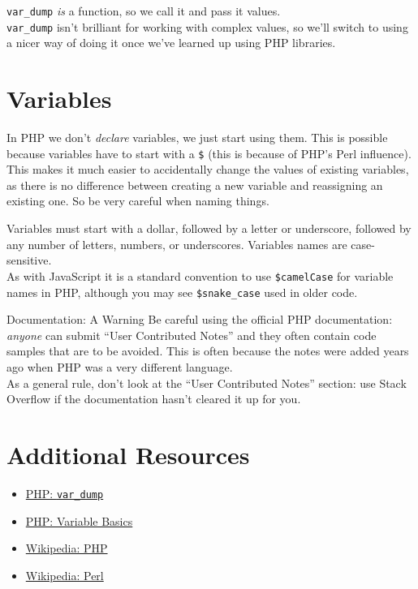 \texttt{var\_dump} \textit{is} a function, so we call it and pass it values.
\\

\texttt{var\_dump} isn't brilliant for working with complex values, so we'll switch to using a nicer way of doing it once we've learned up using PHP libraries.


\section{Variables}

In PHP we don't \textit{declare} variables, we just start using them. This is possible because variables have to start with a \texttt{\$} (this is because of PHP's Perl influence).
\\

This makes it much easier to accidentally change the values of existing variables, as there is no difference between creating a new variable and reassigning an existing one. So be very careful when naming things.


Variables must start with a dollar, followed by a letter or underscore, followed by any number of letters, numbers, or underscores. Variables names are case-sensitive.
\\

As with JavaScript it is a standard convention to use \texttt{\$camelCase} for variable names in PHP, although you may see \texttt{\$snake\_case} used in older code.



\begin{infobox}{Documentation: A Warning}
    Be careful using the official PHP documentation: \textit{anyone} can submit ``User Contributed Notes'' and they often contain code samples that are to be avoided. This is often because the notes were added years ago when PHP was a very different language.
    \\

    As a general rule, don't look at the ``User Contributed Notes'' section: use Stack Overflow if the documentation hasn't cleared it up for you.
\end{infobox}



\section{Additional Resources}

\begin{itemize}[leftmargin=*]
    \item \href{https://www.php.net/manual/en/function.var-dump.php}{PHP: \texttt{var\_dump}}
    \item \href{http://php.net/manual/en/language.variables.basics.php}{PHP: Variable Basics}
    \item \href{https://en.wikipedia.org/wiki/PHP}{Wikipedia: PHP}
    \item \href{https://en.wikipedia.org/wiki/Perl}{Wikipedia: Perl}
\end{itemize}
